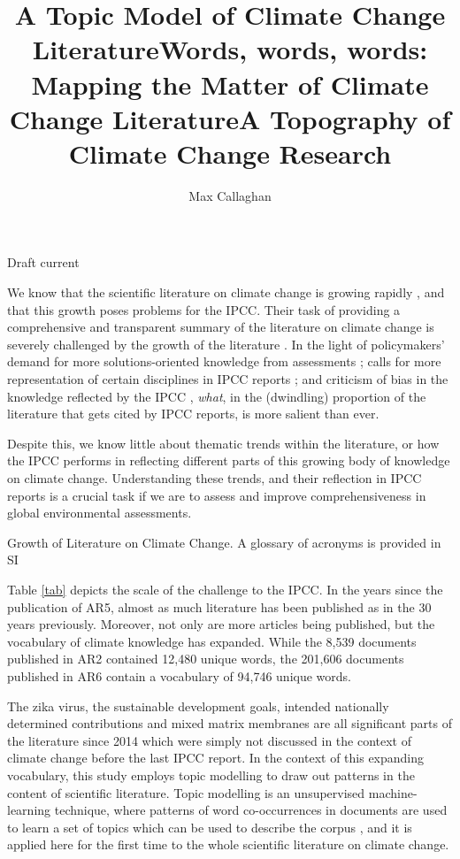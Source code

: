 \documentclass{article}
\title{A Topic Model of Climate Change Literature}
\title{Words, words, words: Mapping the Matter of Climate Change Literature}
\title{A Topography of Climate Change Research}
\author[1,2]{Max Callaghan}
\affil[1]{Mercator Research Institute on Global Commons and Climate Change, Torgauer Straße, 10829 Berlin, Germany}
\affil[2]{School of Earth and Environment, University of Leeds, Leeds LS2 9JT, United Kingdom}
\makeatletter
\renewcommand{\maketitle}{\bgroup\setlength{\parindent}{0pt}
	\begin{flushleft}

		{\huge\textbf{\@title}}

		\bigskip

 		{\large\textbf{\@author}}

 		\bigskip

 		{\large{Draft current \@date}}

	\end{flushleft}\egroup
}
\makeatother
\begin{document}
\maketitle


\begin{linenumbers}

\noindent\textbf{}



\bigskip

\noindent We know that the scientific literature on climate change is growing rapidly \cite{Grieneisen2011}, and that this growth poses problems for the IPCC. Their task of providing a comprehensive and transparent summary of the literature on climate change is severely challenged by the growth of the literature \cite{Minx2017l}. In the light of policymakers' demand for more solutions-oriented knowledge from assessments \cite{Kowarsch2017}; calls for more representation of certain disciplines in IPCC reports \cite{Victor2015, Barnes2013}; and criticism of bias in the knowledge reflected by the IPCC \cite{Bjurström2011, Hulme2010}, \textit{what}, in the (dwindling) proportion of the literature that gets cited by IPCC reports,  is more salient than ever.

Despite this, we know little about thematic trends within the literature, or how the IPCC performs in reflecting different parts of this growing body of knowledge on climate change. Understanding these trends, and their reflection in IPCC reports is a crucial task if we are to assess and improve comprehensiveness in global environmental assessments.

\begin{table}[htp]
	{\scriptsize
		}
	\caption{Growth of Literature on Climate Change. A glossary of acronyms is provided in SI}
	\label{tab}
\end{table}

Table \ref{tab} depicts the scale of the challenge to the IPCC. In the years since the publication of AR5, almost as much literature has been published as in the 30 years previously. Moreover, not only are more articles being published, but the vocabulary of climate knowledge has expanded. While the 8,539 documents published in AR2 contained 12,480 unique words, the 201,606 documents published in AR6 contain a vocabulary of 94,746 unique words.

The zika virus, the sustainable development goals, intended nationally determined contributions and mixed matrix membranes are all significant parts of the literature since 2014 which were simply not discussed in the context of climate change before the last IPCC report. In the context of this expanding vocabulary, this study employs topic modelling to draw out patterns in the content of scientific literature. Topic modelling is an unsupervised machine-learning technique, where patterns of word co-occurrences in documents are used to learn a set of topics which can be used to describe the corpus \cite{Blei2012}, and it is applied here for the first time to the whole scientific literature on climate change.


\end{linenumbers}
\end{document}
